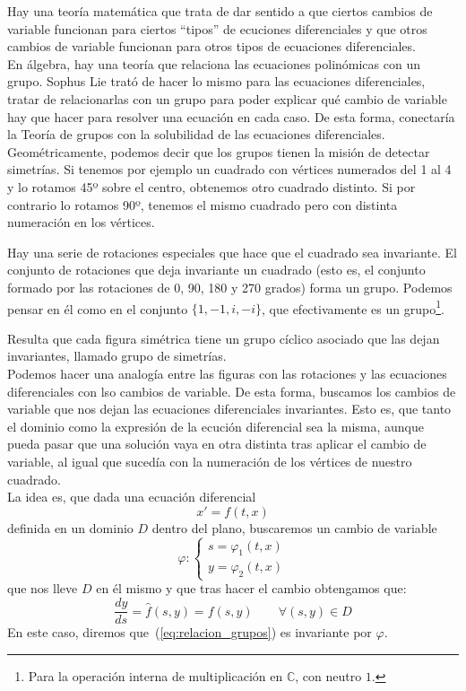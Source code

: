 Hay una teoría matemática que trata de dar sentido a que ciertos cambios de variable funcionan para ciertos ``tipos'' de ecuciones diferenciales y que otros cambios de variable funcionan para otros tipos de ecuaciones diferenciales.\\

En álgebra, hay una teoría que relaciona las ecuaciones polinómicas con un grupo. Sophus Lie trató de hacer lo mismo para las ecuaciones diferenciales, tratar de relacionarlas con un grupo para poder explicar qué cambio de variable hay que hacer para resolver una ecuación en cada caso. De esta forma, conectaría la Teoría de grupos con la solubilidad de las ecuaciones diferenciales.\\

Geométricamente, podemos decir que los grupos tienen la misión de detectar simetrías. Si tenemos por ejemplo un cuadrado con vértices numerados del 1 al 4 y lo rotamos 45º sobre el centro, obtenemos otro cuadrado distinto. Si por contrario lo rotamos 90º, tenemos el mismo cuadrado pero con distinta numeración en los vértices.

Hay una serie de rotaciones especiales que hace que el cuadrado sea invariante. El conjunto de rotaciones que deja invariante un cuadrado (esto es, el conjunto formado por las rotaciones de 0, 90, 180 y 270 grados) forma un grupo. Podemos pensar en él como en el conjunto $\{1, -1, i, -i\}$, que efectivamente es un grupo\footnote{Para la operación interna de multiplicación en $\mathbb{C}$, con neutro $1$.}.

Resulta que cada figura simétrica tiene un grupo cíclico asociado que las dejan invariantes, llamado grupo de simetrías.\\

Podemos hacer una analogía entre las figuras con las rotaciones y las ecuaciones diferenciales con lso cambios de variable. De esta forma, buscamos los cambios de variable que nos dejan las ecuaciones diferenciales invariantes. Esto es, que tanto el dominio como la expresión de la ecución diferencial sea la misma, aunque pueda pasar que una solución vaya en otra distinta tras aplicar el cambio de variable, al igual que sucedía con la numeración de los vértices de nuestro cuadrado.\\

La idea es, que dada una ecuación diferencial
\begin{equation}\label{eq:relacion_grupos}
    x' = f(t,x)
\end{equation}
definida en un dominio $D$ dentro del plano, buscaremos un cambio de variable 
\begin{equation*}
    \varphi: \left\{\begin{array}{rl}
        s = \varphi_1(t,x) \\
        y = \varphi_2(t,x) 
    \end{array}\right.
\end{equation*}
que nos lleve $D$ en él mismo y que tras hacer el cambio obtengamos que:
\begin{equation*}
    \dfrac{dy}{ds} = \hat{f}(s,y) = f(s,y) \qquad \forall (s,y)\in D
\end{equation*}
En este caso, diremos que~(\ref{eq:relacion_grupos}) es invariante por $\varphi$.


